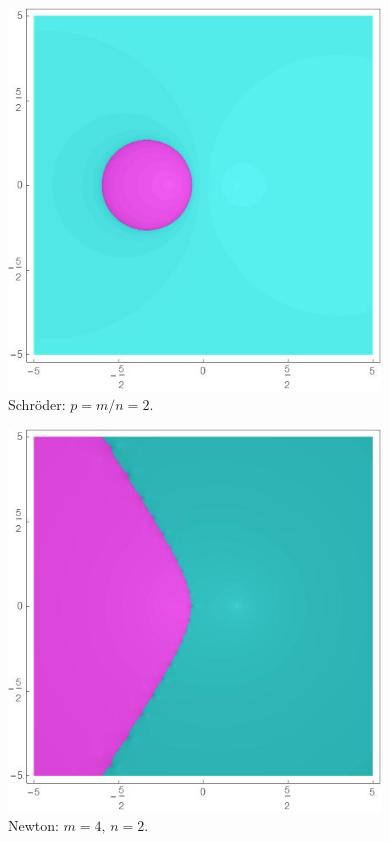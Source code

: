 \begin{figure}[H]
\centering 
\begin{minipage}[t]{0.4\textwidth}
\centering
\includegraphics[width=0.88\textwidth]{fuentes/articulo-cuadraticos/imagenes/sch_m_4n_2.jpg}
\small Schröder: $p=m/n=2.$
\end{minipage}\hfill
\begin{minipage}[t]{0.4\textwidth}
\centering
\includegraphics[width=0.88\textwidth]{fuentes/articulo-cuadraticos/imagenes/newton_m_4n_2.jpg}
\small Newton: $m=4, \, n=2.$
\end{minipage}


\end{figure}
